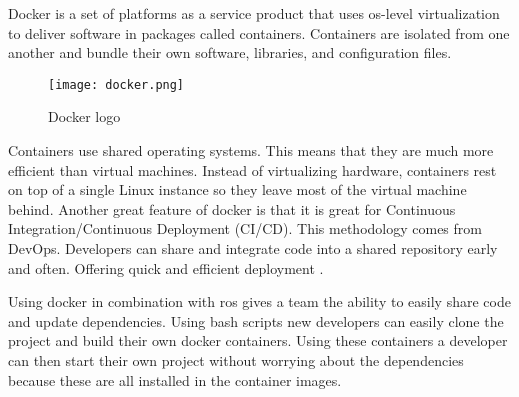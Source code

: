 
Docker is a set of platforms as a service product that uses \acs{os}-level virtualization to deliver software in packages 
called containers. Containers are isolated from one another and bundle their own software, libraries, and configuration files.

\begin{figure}[ht]
    \centering
    \texttt{[image: docker.png]}
    \caption[Docker logo]{Docker logo}
\end{figure}

Containers use shared operating systems. This means that they are much more efficient than virtual machines. 
Instead of virtualizing hardware, containers rest on top of a single Linux instance so they leave most of the virtual machine behind. 
Another great feature of docker is that it is great for Continuous Integration/Continuous Deployment (CI/CD). 
This methodology comes from DevOps. 
Developers can share and integrate code into a shared repository early and often. Offering quick and efficient deployment \cite{docker:article}.

Using docker in combination with \acs{ros} gives a team the ability to easily share code and update dependencies. 
Using bash scripts new developers can easily clone the project and build their own docker containers. Using these containers 
a developer can then start their own project without worrying about the dependencies because these are all installed in the container images.
